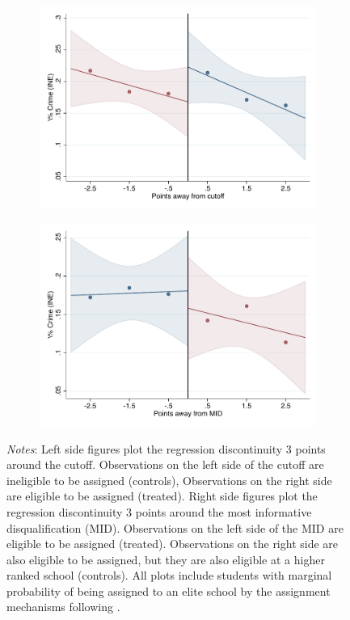 \documentclass[oneside,11pt]{article}
\begin{document}
\begin{figure}[H]
\begin{center}
    \begin{subfigure}{0.475\textwidth}
        \centering
        \includegraphics[width=\textwidth]{04_Figures/rd_plot_tau_Suspencion_INE_UNAM3.pdf}
    \end{subfigure}
    \begin{subfigure}{0.475\textwidth}
        \centering
        \includegraphics[width=\textwidth]{04_Figures/rd_plot_mid_Suspencion_INE_UNAM3.pdf}
    \end{subfigure}
    \end{center}
    
\footnotesize
\textit{Notes}: Left side figures plot the regression discontinuity 3 points around the cutoff. Observations on the left side of the cutoff are ineligible to be assigned (controls), Observations on the right side are eligible to be assigned (treated). Right side figures plot the regression discontinuity 3 points around the most informative disqualification (MID). Observations on the left side of the MID are eligible to be assigned (treated). Observations on the right side are also eligible to be assigned, but they are also eligible at a higher ranked school (controls). All plots include students with marginal probability of being assigned to an elite school by the assignment mechanisms following \citet{abdulkadirouglu2022breaking}. 
\end{figure}
\end{document}
